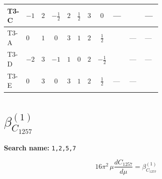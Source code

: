 \documentclass[8pt]{article}
\begin{document}
\begin{landscape}
\begin{longtable}{@{}llcccccc >{\raggedright\arraybackslash}p{0.21\linewidth} >{\raggedright\arraybackslash}p{0.21\linewidth} >{\raggedright\arraybackslash}p{0.21\linewidth}@{}}
\midrule
T3-C & $-1$ & $2$ & $-\frac{1}{2}$ & $2$ & $\frac{1}{2}$ & $3$ & $0$ & --- & \scriptsize\adjustbox{max width=\linewidth}{$\begin{gathered} - \frac{lambdaT_{3} \overline{y_{1}} \overline{y_{2}}}{3 MF}\end{gathered}$} & --- \\
\midrule
T3-A & $0$ & $1$ & $0$ & $3$ & $1$ & $2$ & $\frac{1}{2}$ & \scriptsize\adjustbox{max width=\linewidth}{$\begin{gathered} \frac{\sqrt{3} lambdaT_{3} \overline{y_{1}} \overline{y_{2}}}{3 MF}\end{gathered}$} & --- & --- \\
\midrule
T3-D & $-2$ & $3$ & $-1$ & $1$ & $0$ & $2$ & $-\frac{1}{2}$ & \scriptsize\adjustbox{max width=\linewidth}{$\begin{gathered} \frac{\sqrt{3} lambdaT_{3} \overline{y_{1}} \overline{y_{2}}}{3 MF}\end{gathered}$} & --- & --- \\
\midrule
T3-E & $0$ & $3$ & $0$ & $3$ & $1$ & $2$ & $\frac{1}{2}$ & --- & --- & \scriptsize\adjustbox{max width=\linewidth}{$\begin{gathered} - \frac{\sqrt{6} lambdaT_{3} \overline{y_{1}} \overline{y_{2}}}{3 MF}\end{gathered}$} \\
\midrule
\bottomrule
\end{longtable}
\clearpage
\section*{$\beta_{C_{1257}}^{(1)}$}
\noindent\textbf{Search name: }\texttt{1,2,5,7}\par\smallskip
\[16\pi^2\,\mu\frac{d C_{1257}}{d\mu}=\beta_{C_{1257}}^{(1)}\]

\end{landscape}
\end{document}
